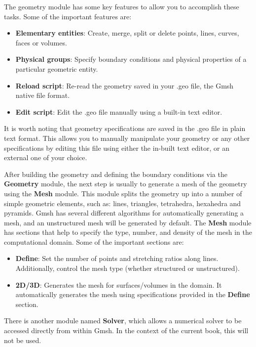The geometry module has some key features to allow you to accomplish these tasks. Some of the important features are:
\begin{itemize}
    \item \textbf{Elementary entities}: Create, merge, split or delete points, lines, curves, faces or volumes.
    \item \textbf{Physical groups}: Specify boundary conditions and physical properties of a particular geometric entity.
    \item \textbf{Reload script}: Re-read the geometry saved in your .geo file, the Gmsh native file format.
    \item \textbf{Edit script}: Edit the .geo file manually using a built-in text editor.
\end{itemize}
It is worth noting that geometry specifications are saved in the .geo file in plain text format. This allows you to manually manipulate your geometry or any other specifications by editing this file using either the in-built text editor, or an external one of your choice. 

After building the geometry and defining the boundary conditions via the \textbf{Geometry} module, the next step is usually to generate a mesh of the geometry using the \textbf{Mesh} module. This module splits the geometry up into a number of simple geometric elements, such as: lines, triangles, tetrahedra, hexahedra and pyramids. Gmsh has several different algorithms for automatically generating a mesh, and an unstructured mesh will be generated by default. The \textbf{Mesh} module has sections that help to specify the type, number, and density of the mesh in the computational domain. Some of the important sections are:
\begin{itemize}
    \item \textbf{Define}: Set the number of points and stretching ratios along lines. Additionally, control the mesh type (whether structured or unstructured).
    \item \textbf{2D/3D}: Generates the mesh for surfaces/volumes in the domain. It automatically generates the mesh using specifications provided in the \textbf{Define} section.
\end{itemize}
There is another module named \textbf{Solver}, which allows a numerical solver to be accessed directly from within Gmsh. In the context of the current book, this will not be used.

